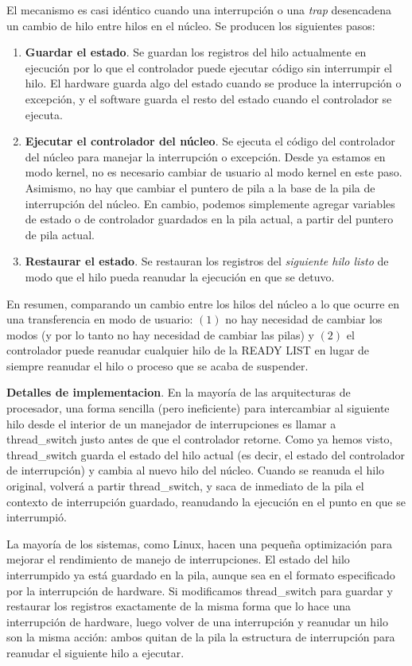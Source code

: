 \documentclass[10pt]{book}
\begin{document}
El mecanismo es casi idéntico cuando una interrupción o una \textit{trap} desencadena un cambio de hilo entre hilos en el núcleo. Se producen los siguientes pasos:
\begin{enumerate}
\item \textbf{Guardar el estado}. Se guardan los registros del hilo actualmente en ejecución por lo que el controlador puede ejecutar código sin interrumpir el hilo. El hardware guarda algo del estado cuando se produce la interrupción o excepción, y el software guarda el resto del estado cuando el controlador se ejecuta.

\item \textbf{Ejecutar el controlador del núcleo}. Se ejecuta el código del controlador del núcleo para manejar la interrupción o excepción. Desde ya estamos en modo kernel, no es necesario cambiar de usuario al modo kernel en este paso. Asimismo, no hay que cambiar el puntero de pila a la base de la pila de interrupción del núcleo. En cambio, podemos simplemente agregar variables de estado o de controlador guardados en la pila actual, a partir del puntero de pila actual.

\item \textbf{Restaurar el estado}. Se restauran los registros del \textit{siguiente hilo listo} de modo que el hilo pueda reanudar la ejecución en que se detuvo.
\end{enumerate}

En resumen, comparando un cambio entre los hilos del núcleo a lo que ocurre en una transferencia en modo de usuario: $(1)$ no hay necesidad de cambiar los modos (y por lo tanto no hay necesidad de cambiar las pilas) y $(2)$ el controlador puede reanudar cualquier hilo de la READY LIST en lugar de siempre reanudar el hilo o proceso que se acaba de suspender.

\textbf{Detalles de implementacion}. En la mayoría de las arquitecturas de procesador, una forma sencilla (pero ineficiente) para intercambiar al siguiente hilo desde el interior de un manejador de interrupciones es llamar a {\mf thread\_switch} justo antes de que el controlador retorne. Como ya hemos visto, {\mf thread\_switch} guarda el estado del hilo actual (es decir, el estado del controlador de interrupción) y cambia al nuevo hilo del núcleo. Cuando se reanuda el hilo original, volverá a partir {\mf thread\_switch}, y saca de inmediato de la pila el contexto de interrupción guardado, reanudando la ejecución en el punto en que se interrumpió.

La mayoría de los sistemas, como Linux, hacen una pequeña optimización para mejorar el rendimiento de manejo de interrupciones. El estado del hilo interrumpido ya está guardado en la pila, aunque sea en el formato especificado por la interrupción de hardware. Si modificamos {\mf thread\_switch} para guardar y restaurar los registros exactamente de la misma forma que lo hace una interrupción de hardware, luego volver de una interrupción y reanudar un hilo son la misma acción: ambos quitan de la pila la estructura de interrupción para reanudar el siguiente hilo a ejecutar.
\end{document}
